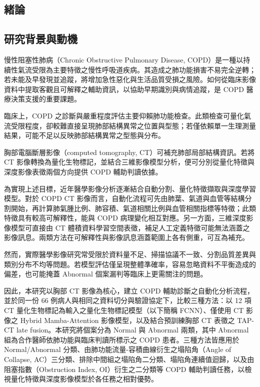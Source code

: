 \begin{ZhChapter}

\chapter{緒論}

\section{研究背景與動機}

慢性阻塞性肺病（Chronic Obstructive Pulmonary Disease, COPD）是一種以持續性氣流受限為主要特徵之慢性呼吸道疾病。其造成之肺功能損害不易完全逆轉；若未能及早發現並追蹤，將增加急性惡化與生活品質受損之風險\cite{gold2025}。如何從臨床影像資料中提取客觀且可解釋之輔助資訊，以協助早期識別與病情追蹤，是 COPD 醫療決策支援的重要課題。

臨床上，COPD 之診斷與嚴重程度評估主要仰賴肺功能檢查。此類檢查可量化氣流受限程度，卻較難直接呈現肺部結構異常之位置與型態；若僅依賴單一生理測量結果，可能不足以反映肺部結構異常之型態與分布\cite{gold2025,park2025qctcopd}。

胸部電腦斷層影像（computed tomography, CT）可補充肺部局部結構資訊。若將 CT 影像轉換為量化生物標記，並結合三維影像模型分析，便可分別從量化特徵與深度影像表徵兩個方向提供 COPD 輔助判讀依據\cite{park2025qctcopd}。

為實現上述目標，近年醫學影像分析逐漸結合自動分割、量化特徵擷取與深度學習模型。對於 COPD CT 影像而言，自動化流程可先由肺葉、氣道與血管等結構分割開始，再計算肺氣腫比例、肺容積、氣道相關比例與血管相關指標等特徵；此類特徵具有較高可解釋性，能與 COPD 病理變化相互對應\cite{park2025qctcopd}。另一方面，三維深度影像模型可直接由 CT 體積資料學習空間表徵，補足人工定義特徵可能無法涵蓋之影像訊息\cite{litjens2017survey,park2023dlpulmonaryct}。兩類方法在可解釋性與影像訊息涵蓋範圍上各有側重，可互為補充。

然而，實際醫學影像研究常受限於資料量不足、掃描協議不一致、分割品質差異與類別分布不均等問題。若模型評估僅呈現整體準確率，容易忽略資料不平衡造成的偏差，也可能掩蓋 Abnormal 個案漏判等臨床上更需關注的問題\cite{he2009imbalanced}。

因此，本研究以胸部 CT 影像為核心，建立 COPD 輔助診斷之自動化分析流程，並於同一份 66 例病人與相同之資料切分與驗證協定下，比較三種方法：以 12 項 CT 量化生物標記為輸入之量化生物標記模型（以下簡稱 FCNN）、僅使用 CT 影像之 Hybrid Mamba-Attention 影像模型，以及結合預訓練胸部 CT 表徵之 TAP-CT late fusion。本研究將個案分為 Normal 與 Abnormal 兩類，其中 Abnormal 組為合作醫師依肺功能與臨床判讀所標示之 COPD 患者。三種方法皆應用於 Normal/Abnormal 分類、由肺功能流量-容積曲線衍生之塌陷角（Angle of Collapse, AC）三分類、排除中間組之塌陷角二分類、塌陷角連續值迴歸，以及由阻塞指數（Obstruction Index, OI）衍生之二分類等 COPD 輔助判讀任務，以檢視量化特徵與深度影像模型於各任務之相對優勢。


\end{ZhChapter}
